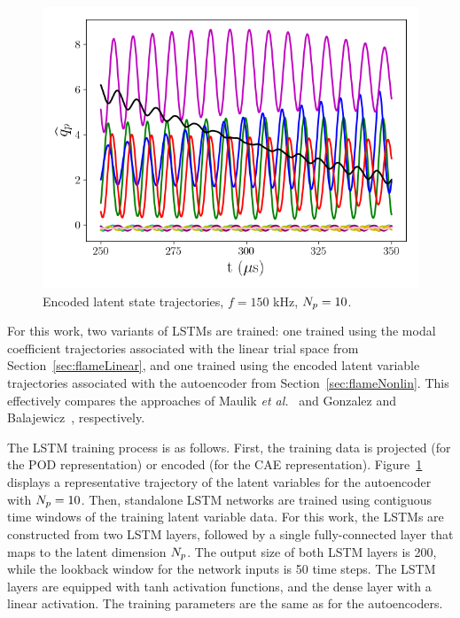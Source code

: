 \begin{figure}
    \centering
    \includegraphics[width=0.6\linewidth]{Chapters/TransientFlame/Images/nonlinear/latent_vars.png}
    \caption{\label{fig:flameLatentVars}Encoded latent state trajectories, $f = 150$ kHz, $N_p = 10$.}
\end{figure}

For this work, two variants of LSTMs are trained: one trained using the modal coefficient trajectories associated with the linear trial space from Section~\ref{sec:flameLinear}, and one trained using the encoded latent variable trajectories associated with the autoencoder from Section~\ref{sec:flameNonlin}. This effectively compares the approaches of Maulik \textit{et al.}~\cite{Maulik2020} and Gonzalez and Balajewicz~\cite{Gonzalez2018}, respectively.

The LSTM training process is as follows. First, the training data is projected (for the POD representation) or encoded (for the CAE representation). Figure~\ref{fig:flameLatentVars} displays a representative trajectory of the latent variables for the autoencoder with $N_p = 10$. Then, standalone LSTM networks are trained using contiguous time windows of the training latent variable data. For this work, the LSTMs are constructed from two LSTM layers, followed by a single fully-connected layer that maps to the latent dimension $N_p$. The output size of both LSTM layers is 200, while the lookback window for the network inputs is 50 time steps. The LSTM layers are equipped with tanh activation functions, and the dense layer with a linear activation. The training parameters are the same as for the autoencoders. 

